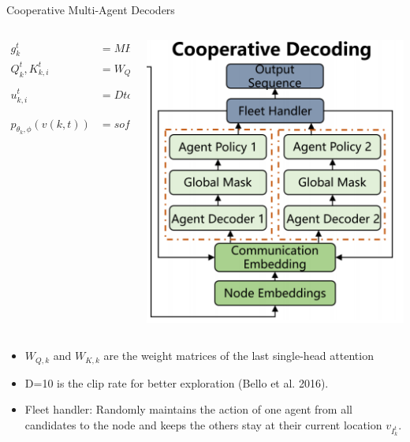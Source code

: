 \documentclass{beamer}
\begin{document}
\begin{frame}{Cooperative Multi-Agent Decoders}
	\begin{columns}
		\begin{column}{0.6\textwidth}
			\footnotesize
			\begin{center}
				\begin{align}
					g_{k}^{t}                   & = MHA_{k,(c)}(h_{1},h_{2},...,h_{2N}),                               \\
					Q_{k}^{t},K_{k,i}^{t}       & = W_{Q,k}g_{k}^{t},W_{K,k}h_{i},                                     \\
					u_{k,i}^{t}                 & = Dtanh\left(\frac{Q_{k}^{t}{}^{T}K_{k,i}^{t}}{\sqrt{d_{k}}}\right), \\
					p_{\theta_{k},\phi}(v(k,t)) & = softmax\left(Mask^{t}(u_{k,i}^{t})\right)
				\end{align}
			\end{center}
		\end{column}
		\begin{column}{0.4\textwidth}
			\centering
			\includegraphics[width=\textwidth]{CD.png} %
		\end{column}
	\end{columns}
	\begin{itemize}
		\footnotesize
		\item $W_{Q,k}$ and $W_{K,k}$ are the weight matrices of the last single-head attention
		\item D=10 is the clip rate for better exploration (Bello et al. 2016).
		\item Fleet handler: Randomly maintains the action of one agent from all candidates to the node and keeps the others stay at their current location $v_{I_k^t}$.
	\end{itemize}
\end{frame}
\end{document}
